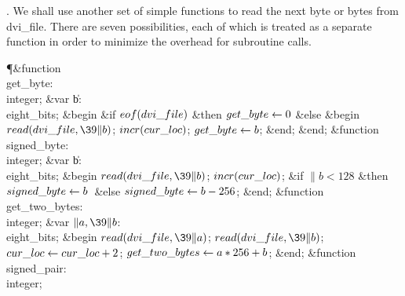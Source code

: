 . We shall use another set of simple functions to read the next byte or
bytes from \\{dvi\_file}. There are seven possibilities, each of which is
treated as a separate function in order to minimize the overhead for
subroutine calls.

\Y\P\4\&{function}\1\  \\{get\_byte}: \\{integer};\6
\4\&{var} \|b: \\{eight\_bits};\2\6
\&{begin} \&{if} $\\{eof}(\\{dvi\_file})$ \1\&{then}\5
$\\{get\_byte}\gets0$\6
\4\&{else} \&{begin} $\\{read}(\\{dvi\_file},\39\|b)$;\5
$\\{incr}(\\{cur\_loc})$;\5
$\\{get\_byte}\gets\hbox{$b$}$;\6
\&{end};\2\6
\&{end};\7
\4\&{function}\1\  \\{signed\_byte}: \\{integer};\6
\4\&{var} \|b: \\{eight\_bits};\2\6
\&{begin} $\\{read}(\\{dvi\_file},\39\|b)$;\5
$\\{incr}(\\{cur\_loc})$;\6
\&{if} $\|b<128$ \1\&{then}\5
$\\{signed\_byte}\gets\hbox{$b$}$\ \&{else} $\\{signed\_byte}\gets\hbox{$b$}-256$;\2\6
\&{end};\7
\4\&{function}\1\  \\{get\_two\_bytes}: \\{integer};\6
\4\&{var} $\|a,\39\|b$: \\{eight\_bits};\2\6
\&{begin} $\\{read}(\\{dvi\_file},\39\|a)$;\5
$\\{read}(\\{dvi\_file},\39\|b)$;\5
$\\{cur\_loc}\gets\\{cur\_loc}+2$;\5
$\\{get\_two\_bytes}\gets\hbox{$a$}\ast256+\hbox{$b$}$;\6
\&{end};\7
\4\&{function}\1\  \\{signed\_pair}: \\{integer};\6
